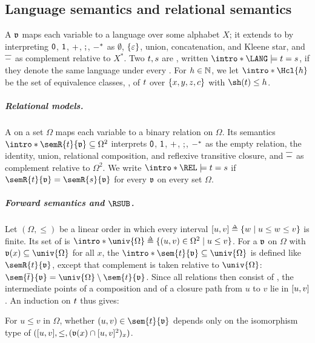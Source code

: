 \subsection{Language semantics and relational semantics}\label{section: semantics}
\AP A  $\mathfrak{v}$ maps each variable to a language over some alphabet $X$; it extends to  by interpreting $\mathsf{0}$, $\mathsf{1}$, $\mathbin{+}$, $\mathbin{;}$, ${-}^{*}$ as $\emptyset$, $\{\varepsilon\}$, union, concatenation, and Kleene star, and $\overline{{-}}$ as complement relative to $X^{*}$.
\AP Two  $\term[1], \term[2]$ are , written $\intro*\LANG \models \term[1] = \term[2]$, if they denote the same language under every .
\AP For $h \in \mathbb{N}$, we let $\intro*\Hcl{h}$ be the set of equivalence classes,  , of  $\term$ over $\{x, y, z, c\}$ with $\sh(\term) \le h$.

\subparagraph*{Relational models.}
\AP A  on a set $\Omega$ maps each variable to a binary relation on $\Omega$.
Its semantics $\intro*\semR{\term}{\val} \subseteq \Omega^{2}$ interprets $\mathsf{0}$, $\mathsf{1}$, $\mathbin{+}$, $\mathbin{;}$, ${-}^{*}$ as the empty relation, the identity, union, relational composition, and reflexive transitive closure, and $\overline{{-}}$ as complement relative to $\Omega^{2}$.
We write $\intro*\REL \models \term[1] = \term[2]$ if $\semR{\term[1]}{\val} = \semR{\term[2]}{\val}$ for every  $\mathfrak{v}$ on every set $\Omega$.

\subparagraph*{Forward semantics and $\RSUB$.}
\AP Let $(\Omega, \le)$ be a linear order in which every interval $\range{u, v} \defeq \set{w \mid u \le w \le v}$ is finite.
Its set of  is $\intro*\univ{\Omega} \defeq \set{(u, v) \in \Omega^2 \mid u \le v}$.
\AP For a  $\mathfrak{v}$ on $\Omega$ with $\val(x) \subseteq \univ{\Omega}$ for all $x$, the  $\intro*\sem{\term}{\val} \subseteq \univ{\Omega}$ is defined like $\semR{\term}{\val}$, except that complement is taken relative to $\univ{\Omega}$: $\sem{\com{\term}}{\val} = \univ{\Omega} \setminus \sem{\term}{\val}$.
Since all relations then consist of , the intermediate points of a composition and of a closure path from $u$ to $v$ lie in $[u, v]$.
An induction on $\term$ thus gives:
\begin{lemma}\label{lemma: locality}
    For $u \le v$ in $\Omega$, whether $(u, v) \in \sem{\term}{\val}$ depends only on the isomorphism type of $([u, v], \le, (\mathfrak{v}(x) \cap [u, v]^2)_{x})$.
\end{lemma}

